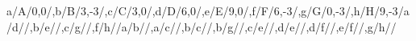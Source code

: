 \begin{compatibilitygraph}{a/A/{0,0}/,b/B/{3,-3}/,c/C/{3,0}/,d/D/{6,0}/,e/E/{9,0}/,f/F/{6,-3}/,g/G/{0,-3}/,h/H/{9,-3}/}{a/d//,b/e//,c/g//,f/h//}{a/b//,a/c//,b/c//,b/g//,c/e//,d/e//,d/f//,e/f//,g/h//}{}{}
\end{compatibilitygraph}